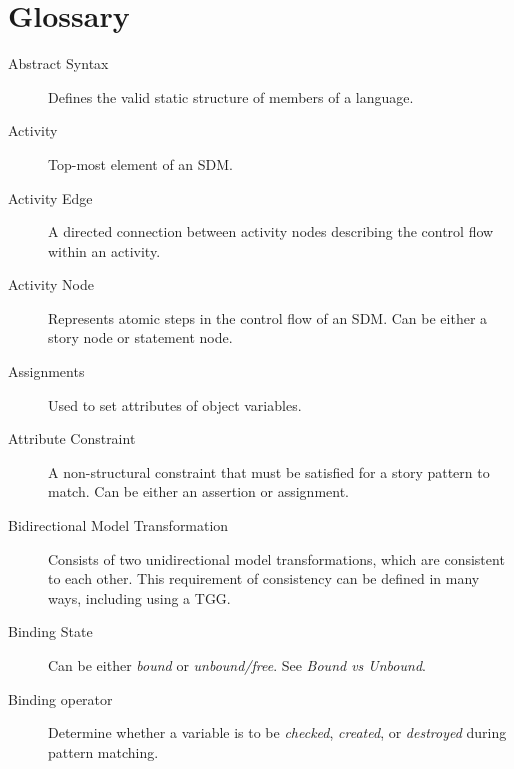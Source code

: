 % 
% 

\newpage
\genHeader
\hypertarget{glossary}{}
\section{Glossary}


\begin{description}

\item[Abstract Syntax] %
Defines the valid static structure of members of a language. 

\item[Activity] %
Top-most element of an SDM.

\item[Activity Edge] %
A directed connection between activity nodes describing the control flow within an activity.

\item[Activity Node] %
Represents atomic steps in the control flow of an SDM. Can be either a story node or statement node.

\item[Assignments] %
Used to set attributes of object variables.

\item[Attribute Constraint] %
A non-structural constraint that must be satisfied for a story pattern to match. Can be either an assertion or assignment.

\item[Bidirectional Model Transformation] %
Consists of two unidirectional mo\-del transformations, which are consistent to each other. This requirement of
consistency can be defined in many ways, including using a TGG.

\item[Binding State] %
Can be either \emph{bound} or \emph{unbound/free}. See \emph{Bound vs Unbound}.

\item[Binding operator] %
Determine whether a variable is to be \emph{checked}, \emph{created}, or \emph{destroyed} during pattern matching.


\end{description}
